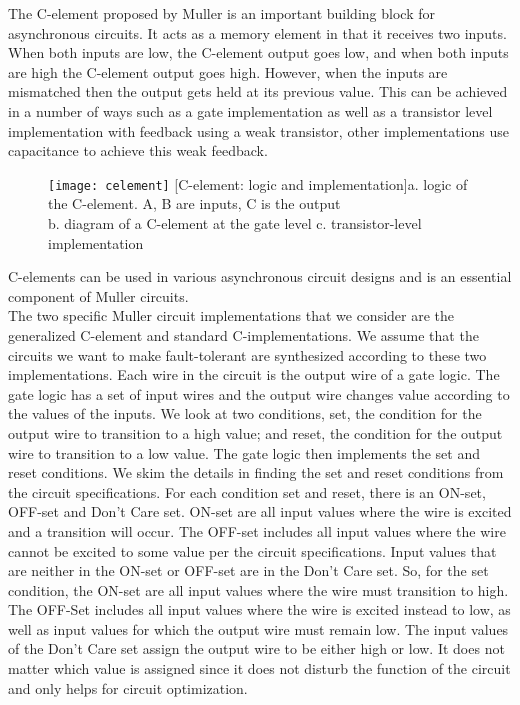 \documentclass[12pt]{report}
\begin{document}
The C-element proposed by Muller is an important building block for asynchronous circuits. It acts as a memory element in that it receives two inputs. When both inputs are low, the C-element output goes low, and when both inputs are high the C-element output goes high. However, when the inputs are mismatched then the output gets held at its previous value. This can be achieved in a number of ways such as a gate implementation as well as a transistor level implementation with feedback using a weak transistor, other implementations use capacitance to achieve this weak feedback.
\begin{figure}
\texttt{[image: celement]}
[C-element: logic and implementation]{a. logic of the C-element. A, B are inputs, C is the output \\ b. diagram of a C-element at the gate level c. transistor-level implementation}
\end{figure}

C-elements can be used in various asynchronous circuit designs and is an essential component of Muller circuits. \\

The two specific Muller circuit implementations that we consider are the generalized C-element and standard C-implementations. We assume that the circuits we want to make fault-tolerant are synthesized according to these two implementations. 
Each wire in the circuit is the output wire of a gate logic. The gate logic has a set of input wires and the output wire changes value according to the values of the inputs. We look at two conditions, set, the condition for the output wire to transition to a high value; and reset, the condition for the output wire to transition to a low value. The gate logic then implements the set and reset conditions. 
We skim the details in finding the set and reset conditions from the circuit specifications. For each condition set and reset, there is an ON-set, OFF-set and Don't Care set. ON-set are all input values where the wire is excited and a transition will occur. The OFF-set includes all input values where the wire cannot be excited to some value per the circuit specifications. Input values that are neither in the ON-set or OFF-set are in the Don't Care set. So, for the set condition, the ON-set are all input values where the wire must transition to high. The OFF-Set includes all input values where the wire is excited instead to low, as well as input values for which the output wire must remain low. The input values of the Don't Care set assign the output wire to be either high or low. It does not matter which value is assigned since it does not disturb the function of the circuit and only helps for circuit optimization. \\
\end{document}
